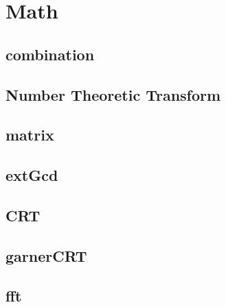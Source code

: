 \section{Math}

\subsection{combination}


\subsection{Number Theoretic Transform}


\subsection{matrix}


\subsection{extGcd}


\subsection{CRT}


\subsection{garnerCRT}


\subsection{fft}

